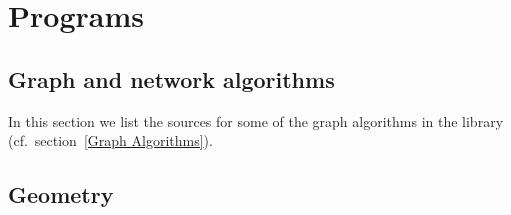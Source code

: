 \chapter{Programs}

\label{Programs}

\bigskip
\section{Graph and network algorithms}

\label{Graph and network algorithms}

In this section we list the \CC sources for some of the graph algorithms
in the library (cf.~section~\ref{Graph Algorithms}).




\newpage
\section{Geometry}

\label{Geometry}






